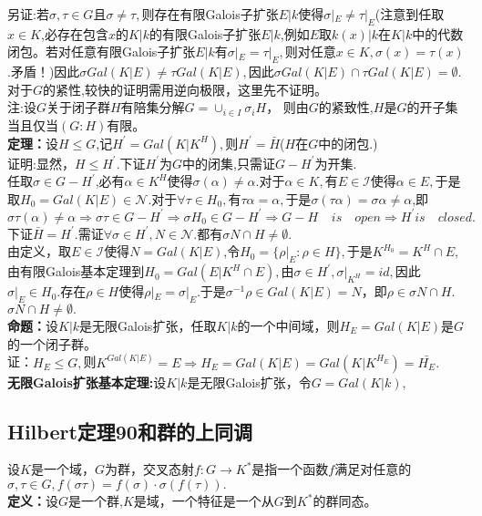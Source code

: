 \documentclass[UTF8]{article}
\begin{document}
   另证:若$\sigma,\tau \in G$且$\sigma \neq \tau,$则存在有限Galois子扩张$E|k$使得$\sigma|_{E}\neq \tau|_{E}$(注意到任取$x\in K$,必存在包含$x$的$K|k$的有限Galois子扩张$E|k$,例如$E$取$k(x)|k$在$K|k$中的代数闭包。若对任意有限Galois子扩张$E|k$有$\sigma|_{E}=\tau|_{E},$则对任意$x\in K,\sigma(x)=\tau(x)$.矛盾！)因此$\sigma Gal(K|E)\neq \tau Gal(K|E),$因此$\sigma Gal(K|E)\cap \tau Gal(K|E)=\emptyset.$\\
   对于$G$的紧性,较快的证明需用逆向极限，这里先不证明。\\

     注:设$G$关于闭子群$H$有陪集分解$G=\cup_{i\in I}\sigma_{i}H$，
     则由$G$的紧致性,$H$是$G$的开子集当且仅当$(G:H)$有限。\\
   \textbf{定理：}设$H\leq G$,记$H^{'}=Gal(K|K^{H}),$则$H^{'}=\bar{H}$($H$在$G$中的闭包.)\\
   证明:显然，$H\leq H^{'}.$下证$H^{'}$为$G$中的闭集,只需证$G-H^{'}$为开集.\\
   
   任取$\sigma\in G-H^{'}$,必有$\alpha \in K^{H}$使得$\sigma(\alpha)\neq \alpha.$对于$\alpha\in K,$有$E\in\mathcal{I}$使得$\alpha\in E,$于是取$H_{0}=Gal(K|E)\in\mathcal{N}.$对于$\forall\tau\in H_{0},$有$\tau\alpha=\alpha ,$于是$\sigma(\tau\alpha)=\sigma\alpha\neq \alpha $,即$$\sigma\tau(\alpha)\neq\alpha 
 \Rightarrow\sigma\tau\in G-H^{'}\Rightarrow\sigma H_{0}\in G-H^{'}\Rightarrow G-H^{}\quad is\quad open\Rightarrow H^{'}is\quad  closed.$$
 下证$\bar{H}=H^{'}.$需证$\forall \sigma \in H^{'},N\in \mathcal{N}.$都有$\sigma N\cap H\neq \emptyset.$\\
 由定义，取$E\in \mathcal{I}$使得$N=Gal(K|E)$,令$H_{0}=\{\rho|_{E}:\rho\in H\},$于是$K^{H_{0}}=K^{H}\cap E,$由有限Galois基本定理到$H_{0}=Gal(E|K^{H}\cap E),$由$\sigma \in H^{'},\sigma|_{K^{H}}=id,$因此$\sigma|_{E}\in H_{0}.$存在$\rho\in H$使得$
 \rho|_{E}=\sigma|_{E}.$于是$\sigma^{-1}\rho \in Gal(K|E)=N$，即$\rho\in \sigma N\cap H.$$\sigma N\cap H\neq \emptyset.$\\
   
   \textbf{命题：}设$K|k$是无限Galois扩张，任取$K|k$的一个中间域，则$H_{E}=Gal(K|E)$是$G$的一个闭子群。\\
   证：$H_{E}\leq G,$则$K^{Gal(K|E)}=E\Rightarrow H_{E}=Gal(K|E)=Gal(K|K^{H_{E}})=\bar{H_{E}}.$\\
   \textbf{无限Galois扩张基本定理:}设$K|k$是无限Galois扩张，令$G=Gal(K|k),$
   \subsection{Hilbert定理90和群的上同调}
    设$K$是一个域，$G$为群，交叉态射$f:G\rightarrow K^{*}$是指一个函数$f$满足对任意的$\sigma ,\tau\in G,f(\sigma\tau)=f(\sigma)\cdot\sigma(f(\tau)).$\\
    \textbf{定义：}设$G$是一个群,$K$是域，一个特征是一个从$G$到$K^{*}$的群同态。\\
    
\end{document}
